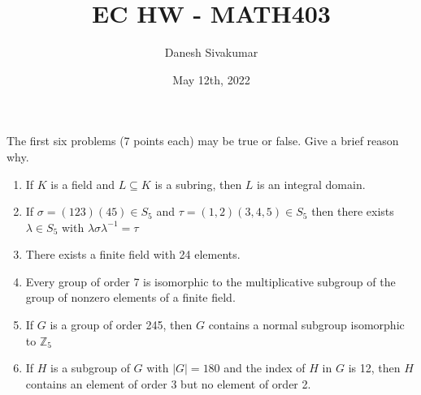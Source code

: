 \documentclass{article}
\title{EC HW - MATH403}
\author{Danesh Sivakumar}
\date{May 12th, 2022}
\newif\ifanswers
\begin{document}
\maketitle


The first six problems (7 points each) may be true or false. Give a brief reason why.
\begin{enumerate}
\item If $K$ is a field and $L \subseteq K$ is a subring, then $L$ is an integral domain.
\ifanswers
\textbf{Solution:}
True; we will show that $L$ has no zero divisors. Suppose $x, y \in L$ with $xy = 0$. Then it
follows that $x, y \in K$, meaning that $x = 0$ or $y = 0$ because $K$ is a field.
\fi
\item If $\sigma = (123)(45) \in S_5$ and $\tau = (1, 2)(3, 4, 5) \in S_5$ then there exists
$\lambda \in S_5$ with $\lambda\sigma\lambda^{-1} = \tau$
\newline
\ifanswers
\textbf{Solution:}
True; both $\sigma$ and $\tau$ have the same cycle structure (they are each the product of a
2-cycle and 3-cycle), so they are conjugate.
\fi

\item There exists a finite field with 24 elements.
\newline
\ifanswers
\textbf{Solution:}
False; the order of any finite field must always be the power of a prime $p$, and 24 is not 
a power of a prime.
\fi

\item Every group of order 7 is isomorphic to the multiplicative subgroup of the group of 
nonzero elements of a finite field.
\newline
\ifanswers
\textbf{Solution:}
True; every group of order 7 is the same up to isomorphism because 7 is prime, so take any finite field with 7 elements (which is guaranteed to exist because 7 is prime). 
\fi

\item If $G$ is a group of order 245, then $G$ contains a normal subgroup isomorphic to 
$\mathbb{Z}_5$
\newline
\ifanswers
\textbf{Solution:}
True; observe that $245 = 7^2 \cdot 5$, meaning that the number of $5$-Sylow subgroups of $G$ 
is equal to $1 \mod {5}$ and divides 49; this implies that there is only one $5$-Sylow subgroup,
so it is normal due to its uniqeueness. Furthermore, this subgroup has prime order 5, meaning 
that it must be cyclic and thus isomorphic to $\mathbb{Z}_5$.
\fi

\item If $H$ is a subgroup of $G$ with $|G| = 180$ and the index of $H$ in $G$ is 12, then
$H$ contains an element of order 3 but no element of order 2.
\newline
\ifanswers
\textbf{Solution:}
True; observe that $|H| = 180/12 = 15$, and 2 does not divide 15 so there cannot be an element
of order 2. However, 3 (a prime) divides 15, and by Cauchy's theorem it follows that there
is an element of order 3.
\fi


\end{enumerate}
\end{document}

